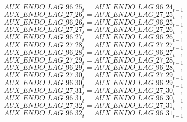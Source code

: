 \begin{dmath}
{AUX\_ENDO\_LAG\_96\_25}_{t}={AUX\_ENDO\_LAG\_96\_24}_{t-1}
\end{dmath}
\begin{dmath}
{AUX\_ENDO\_LAG\_27\_26}_{t}={AUX\_ENDO\_LAG\_27\_25}_{t-1}
\end{dmath}
\begin{dmath}
{AUX\_ENDO\_LAG\_96\_26}_{t}={AUX\_ENDO\_LAG\_96\_25}_{t-1}
\end{dmath}
\begin{dmath}
{AUX\_ENDO\_LAG\_27\_27}_{t}={AUX\_ENDO\_LAG\_27\_26}_{t-1}
\end{dmath}
\begin{dmath}
{AUX\_ENDO\_LAG\_96\_27}_{t}={AUX\_ENDO\_LAG\_96\_26}_{t-1}
\end{dmath}
\begin{dmath}
{AUX\_ENDO\_LAG\_27\_28}_{t}={AUX\_ENDO\_LAG\_27\_27}_{t-1}
\end{dmath}
\begin{dmath}
{AUX\_ENDO\_LAG\_96\_28}_{t}={AUX\_ENDO\_LAG\_96\_27}_{t-1}
\end{dmath}
\begin{dmath}
{AUX\_ENDO\_LAG\_27\_29}_{t}={AUX\_ENDO\_LAG\_27\_28}_{t-1}
\end{dmath}
\begin{dmath}
{AUX\_ENDO\_LAG\_96\_29}_{t}={AUX\_ENDO\_LAG\_96\_28}_{t-1}
\end{dmath}
\begin{dmath}
{AUX\_ENDO\_LAG\_27\_30}_{t}={AUX\_ENDO\_LAG\_27\_29}_{t-1}
\end{dmath}
\begin{dmath}
{AUX\_ENDO\_LAG\_96\_30}_{t}={AUX\_ENDO\_LAG\_96\_29}_{t-1}
\end{dmath}
\begin{dmath}
{AUX\_ENDO\_LAG\_27\_31}_{t}={AUX\_ENDO\_LAG\_27\_30}_{t-1}
\end{dmath}
\begin{dmath}
{AUX\_ENDO\_LAG\_96\_31}_{t}={AUX\_ENDO\_LAG\_96\_30}_{t-1}
\end{dmath}
\begin{dmath}
{AUX\_ENDO\_LAG\_27\_32}_{t}={AUX\_ENDO\_LAG\_27\_31}_{t-1}
\end{dmath}
\begin{dmath}
{AUX\_ENDO\_LAG\_96\_32}_{t}={AUX\_ENDO\_LAG\_96\_31}_{t-1}
\end{dmath}
